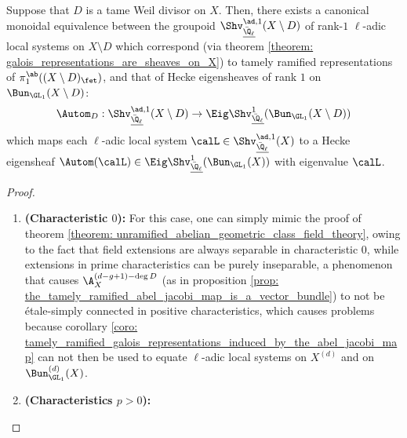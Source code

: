     \begin{theorem} \label{theorem: tamely_ramified_abelian_geometric_class_field_theory}
            Suppose that $D$ is a tame Weil divisor on $X$. Then, there exists a canonical monoidal equivalence between the groupoid $\Shv_{\underline{\bar{\Q}_{\ell}}}^{\ad, 1}(X \setminus D)$ of rank-$1$ $\ell$-adic local systems on $X \setminus D$ which correspond (via theorem \ref{theorem: galois_representations_are_sheaves_on_X}) to tamely ramified representations of $\pi_1^{\ab}((X \setminus D)_{\fet})$, and that of Hecke eigensheaves of rank $1$ on $\Bun_{\GL_1}(X \setminus D)$:
                $$\Autom_D: \Shv_{\underline{\bar{\Q}_{\ell}}}^{\ad, 1}(X \setminus D) \to \Eig\Shv_{\underline{\bar{\Q}_{\ell}}}^1(\Bun_{\GL_1}(X \setminus D))$$
            which maps each $\ell$-adic local system $\calL \in \Shv_{\underline{\bar{\Q}_{\ell}}}^{\ad, 1}(X)$ to a Hecke eigensheaf $\Autom(\calL) \in \Eig\Shv_{\underline{\bar{\Q}_{\ell}}}^1(\Bun_{\GL_1}(X))$ with eigenvalue $\calL$.
        \end{theorem}
            \begin{proof}
                \noindent
                \begin{enumerate}
                    \item \textbf{(Characteristic $0$):} For this case, one can simply mimic the proof of theorem \ref{theorem: unramified_abelian_geometric_class_field_theory}, owing to the fact that field extensions are always separable in characteristic $0$, while extensions in prime characteristics can be purely inseparable, a phenomenon that causes $\A_X^{(d - g + 1) - \deg D}$ (as in proposition \ref{prop: the_tamely_ramified_abel_jacobi_map_is_a_vector_bundle}) to not be \'etale-simply connected in positive characteristics, which causes problems because corollary \ref{coro: tamely_ramified_galois_representations_induced_by_the_abel_jacobi_map} can not then be used to equate $\ell$-adic local systems on $X^{(d)}$ and on $\Bun_{\GL_1}^{(d)}(X)$. 
                    \item \textbf{(Characteristics $p > 0$):} 
                \end{enumerate}
            \end{proof}
            
